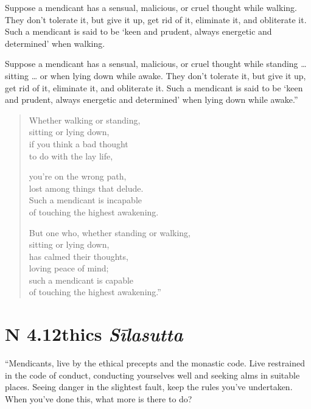 \documentclass[12pt,openany]{book}%
\newcommand*{\suttatitleacronym}[1]{\smaller[2]{#1}\vspace*{.3em}}
\newcommand*{\suttatitletranslation}[1]{\linebreak{#1}}
\newcommand*{\suttatitleroot}[1]{\linebreak\smaller[2]\itshape{#1}}
\newcommand*{\tocacronym}[1]{\hspace*{-3.3em}{#1}\quad}
\newcommand*{\toctranslation}[1]{#1}
\newcommand*{\tocroot}[1]{(\textit{#1})}
\begin{document}
Suppose a mendicant has a sensual, malicious, or cruel thought while walking. They don’t tolerate it, but give it up, get rid of it, eliminate it, and obliterate it. Such a mendicant is said to be ‘keen and prudent, always energetic and determined’ when walking. 

Suppose a mendicant has a sensual, malicious, or cruel thought while standing … sitting … or when lying down while awake. They don’t tolerate it, but give it up, get rid of it, eliminate it, and obliterate it. Such a mendicant is said to be ‘keen and prudent, always energetic and determined’ when lying down while awake.” 

\begin{verse}%
Whether walking or standing, \\
sitting or lying down, \\
if you think a bad thought \\
to do with the lay life, 

you’re on the wrong path, \\
lost among things that delude. \\
Such a mendicant is incapable \\
of touching the highest awakening. 

But one who, whether standing or walking, \\
sitting or lying down, \\
has calmed their thoughts, \\
loving peace of mind; \\
such a mendicant is capable \\
of touching the highest awakening.” 

%
\end{verse}

%
\section*{{\suttatitleacronym AN 4.12}{\suttatitletranslation Ethics }{\suttatitleroot Sīlasutta}}
\addcontentsline{toc}{section}{\tocacronym{AN 4.12} \toctranslation{Ethics } \tocroot{Sīlasutta}}

“Mendicants, live by the ethical precepts and the monastic code. Live restrained in the code of conduct, conducting yourselves well and seeking alms in suitable places. Seeing danger in the slightest fault, keep the rules you’ve undertaken. When you’ve done this, what more is there to do? 
\end{document}
